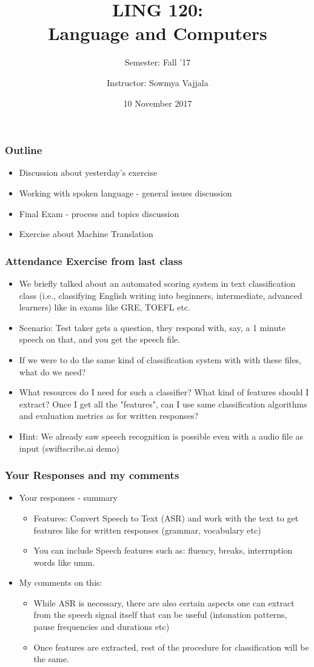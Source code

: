 \documentclass{beamer}
\author[Sowmya Vajjala]{Instructor: Sowmya Vajjala}
\title[LING 120]{LING 120: \\ Language and Computers}
\subtitle{Semester: Fall '17}
\date{10 November 2017}
\institute{Iowa State University, USA}
\begin{document}
\begin{frame}\titlepage
\end{frame}

\begin{frame}
\frametitle{Outline}
\begin{itemize}
\item Discussion about yesterday's exercise
\item Working with spoken language - general issues discussion
\item Final Exam - process and topics discussion
\item Exercise about Machine Translation
\end{itemize}
\end{frame}

\begin{frame}
\frametitle{Attendance Exercise from last class}
\begin{itemize}
\item We briefly talked about an automated scoring system in text classification class (i.e., classifying English writing into beginners, intermediate, advanced learners) like in exams like GRE, TOEFL etc. 
\item Scenario: Test taker gets a question, they respond with, say, a 1 minute speech on that, and you get the speech file. 
\item If we were to do the same kind of classification system with with these files, what do we need?
\item What resources do I need for such a classifier? What kind of features should I extract? Once I get all the "features", can I use same classification algorithms and evaluation metrics as for written responses?
\item Hint: We already saw speech recognition is possible even with a audio file as input (swiftscribe.ai demo)
\end{itemize}
\end{frame}

\begin{frame}
\frametitle{Your Responses and my comments}
\begin{itemize}
\item Your responses - summary
\begin{itemize}
\item Features: Convert Speech to Text (ASR) and work with the text to get features like for written responses (grammar, vocabulary etc)
\item You can include Speech features such as: fluency, breaks, interruption words like umm.
\end{itemize}
\item My comments on this:
\begin{itemize}
\item While ASR is necessary, there are also certain aspects one can extract from the speech signal itself that can be useful (intonation patterns, pause frequencies and durations etc)
\item Once features are extracted, rest of the procedure for classification will be the same.
\end{itemize}
\end{itemize}
\end{frame}
\end{document}
